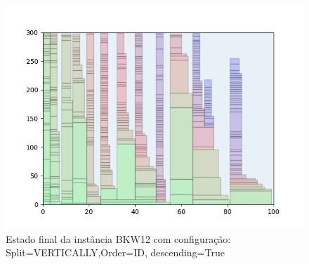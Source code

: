 \begin{figure}[H]
    \centering
    \caption[]{Estado final da instância BKW12 com configuração: Split=VERTICALLY,Order=ID, descending=True}
    \label{fig:bkw12-vertically-id-true}
    \includegraphics[scale=0.5]{output/figures/bkw/bkw12/vertically/id/true/000}
\end{figure}
